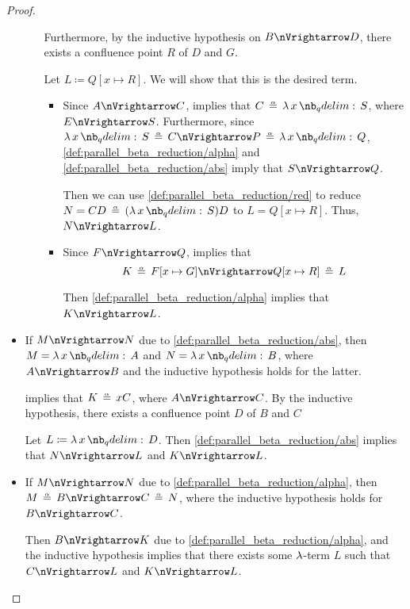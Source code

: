 \begin{proof}
\begin{itemize}
\begin{itemize}
      Furthermore, by the inductive hypothesis on \( B \pred D \), there exists a confluence point \( R \) of \( D \) and \( G \).

      Let \( L \coloneqq Q[x \mapsto R] \). We will show that this is the desired term.
      \begin{itemize}
        \item Since \( A \pred C \),  implies that \( C \aequiv \qabs x S \), where \( E \pred S \). Furthermore, since \( \qabs x S \aequiv C \pred P \aequiv \qabs x Q \), \ref{def:parallel_beta_reduction/alpha} and \ref{def:parallel_beta_reduction/abs} imply that \( S \pred Q \).

        Then we can use \ref{def:parallel_beta_reduction/red} to reduce \( N = CD \aequiv (\qabs x S) D \) to \( L = Q[x \mapsto R] \). Thus, \( N \pred L \).

        \item Since \( F \pred Q \),  implies that
        \begin{equation*}
          K \aequiv F[x \mapsto G] \pred Q[x \mapsto R] \aequiv L
        \end{equation*}

         Then \ref{def:parallel_beta_reduction/alpha} implies that \( K \pred L \).
      \end{itemize}
    \end{itemize}

    \item If \( M \pred N \) due to \ref{def:parallel_beta_reduction/abs}, then \( M = \qabs x A \) and \( N = \qabs x B \), where \( A \pred B \) and the inductive hypothesis holds for the latter.

     implies that \( K \aequiv x C \), where \( A \pred C \). By the inductive hypothesis, there exists a confluence point \( D \) of \( B \) and \( C \)

    Let \( L \coloneqq \qabs x D \). Then \ref{def:parallel_beta_reduction/abs} implies that \( N \pred L \) and \( K \pred L \).

    \item If \( M \pred N \) due to \ref{def:parallel_beta_reduction/alpha}, then \( M \aequiv B \pred C \aequiv N \), where the inductive hypothesis holds for \( B \pred C \).

    Then \( B \pred K \) due to \ref{def:parallel_beta_reduction/alpha}, and the inductive hypothesis implies that there exists some \( \mathrm{\lambda} \)-term \( L \) such that \( C \pred L \) and \( K \pred L \).


\end{itemize}
\end{proof}
